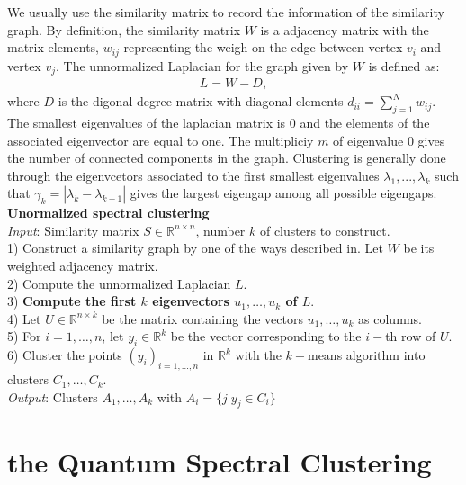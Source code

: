 \documentclass[onecolumn,notitlepage]{revtex4-1}
\begin{document}
We usually use the similarity matrix to record the information of the similarity graph. By definition, the similarity matrix $W$ is a adjacency matrix with the matrix elements, $w_{ij}$ representing the weigh on the edge between vertex $v_{i}$ and vertex $v_{j}$. The unnormalized Laplacian
for the graph given by $W$ is defined as:
\begin{align}
    L= W-D,
\end{align}
where $D$ is the digonal degree matrix with diagonal elements $d_{ii} = \sum_{j=1}^N w_{ij}$. The smallest eigenvalues of the laplacian matrix is 0 and the elements of the associated eigenvector are equal to one. The multipliciy $m$ of eigenvalue 0 gives the number of connected components in the graph. Clustering is generally done through the eigenvcetors associated to the first smallest eigenvalues $\lambda_1,...,\lambda_k$ such that $\gamma_{k}=|\lambda_{k}-\lambda_{k+1}|$ gives the largest eigengap among all possible eigengaps.\\
\textbf{Unormalized spectral clustering}\\
\emph{Input}: Similarity matrix $S \in \mathbb{R}^{n\times n}$, number $k$ of clusters to construct.\\
1) Construct a similarity graph by one of the ways described in. Let $W$ be its weighted adjacency matrix.\\
2) Compute the unnormalized Laplacian $L$.\\
3) \textbf{Compute the first $k$ eigenvectors $u_{1},\ldots,u_{k}$ of $L$}.\\
4) Let $U \in \mathbb{R}^{n \times k}$ be the matrix containing the vectors $u_{1},\ldots,u_{k}$ as columns.\\
5) For $i=1,\ldots,n$, let $y_{i} \in \mathbb{R}^{k}$ be the vector corresponding to the $i-$th row of $U$.\\
6) Cluster the points $(y_{i})_{i=1,\ldots,n}$ in $\mathbb{R}^{k}$ with the $k-$means algorithm into clusters $C_{1},\ldots,C_{k}$.\\
\emph{Output}: Clusters $A_{1},\ldots,A_{k}$ with $A_{i}=\{j|y_{j}\in C_{i}\}$



\section{the Quantum Spectral Clustering}
\end{document}
